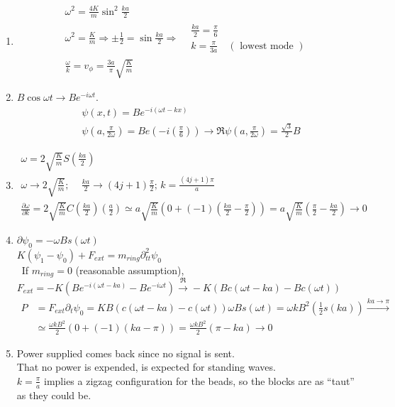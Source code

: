 \documentclass[twoside,10pt]{amsart}
\newcommand{\problemhead}[1]
  {\smallskip
   \noindent{\large\bf Problem #1.}
   \smallskip}
\begin{document}
\problemhead{10.4} 
\begin{enumerate}
  \item \[
    \begin{gathered}
      \omega^2 = \frac{4K}{m} \sin^2{ \frac{ka}{2} } \\
      \omega^2 = \frac{K}{m} \Longrightarrow \pm \frac{1}{2} = \sin{ \frac{ka}{2} } \Longrightarrow \begin{aligned}
	& \frac{ka}{2} = \frac{\pi}{6} \\ 
	& k = \frac{\pi}{3a} \quad ( \text{ lowest mode } ) 
      \end{aligned} \\
      \frac{ \omega}{k} = v_{\phi} = \frac{3a}{\pi} \sqrt{ \frac{K}{m} }
    \end{gathered}
    \]
  \item $B\cos{ \omega t} \to Be^{ -i\omega t}$.  
\[
\begin{aligned}
  & \psi(x,t) = Be^{-i (\omega t - kx) } \\
  & \psi(a,\frac{\pi}{2\omega } ) = Be(-i \left( \frac{\pi}{6} \right)) \to \Re{\psi(a, \frac{\pi}{2 \omega } )} = \frac{\sqrt{3}}{2} B 
\end{aligned}
\]
  \item \[
\begin{gathered}
  \omega  = 2 \sqrt{ \frac{K}{m}} S\left( \frac{ka}{2} \right) \\
  \omega \to 2 \sqrt{ \frac{K}{m}}; \quad \, \frac{ka}{2} \to (4j+1)\frac{\pi}{2}; \, k = \frac{ (4j+1)\pi}{a} \\
  \frac{ \partial \omega}{ \partial k } = 2 \sqrt{ \frac{K}{m}} C\left( \frac{ka}{2} \right)\left( \frac{a}{2} \right) \simeq a \sqrt{ \frac{K}{m} } ( 0 + (-1) \left( \frac{ka}{2} - \frac{\pi}{2} \right) ) = a \sqrt{ \frac{K}{m}} \left( \frac{\pi}{2} - \frac{ka}{2} \right) \to 0 
\end{gathered}
\]
\item $\partial \psi_0 = - \omega B s(\omega t)$ \medskip \\
$K(\psi_1 - \psi_0) + F_{ext} = m_{ring} \partial^2_{tt} \psi_0$ \\
  \quad \, If $m_{ring} = 0$ (reasonable assumption), \\
  \quad \quad $F_{ext} = -K (Be^{ - i (\omega t - ka) } - Be^{ - i \omega t} ) \xrightarrow{ \Re } -K(Bc(\omega t - ka) - Bc(\omega t) )$
\[
\begin{aligned}
  P & = F_{ext} \partial_t \psi_0 = KB (c(\omega t - ka) - c(\omega t)) \omega B s(\omega t) = \omega k B^2 \left( \frac{1}{2} s(ka) \right) \xrightarrow{ ka \to \pi } \\
  & \simeq \frac{ \omega k B^2}{2} (0 + (-1)(ka - \pi) ) = \frac{ \omega k B^2}{2} ( \pi - ka) \to 0 
\end{aligned}
\]
\item Power supplied comes back since no signal is sent.  \\
That no power is expended, is expected for standing waves.   \\
$k = \frac{\pi}{a}$ implies a zigzag configuration for the beads, so the blocks are as ``taut'' as they could be.  
\end{enumerate}
\end{document}
